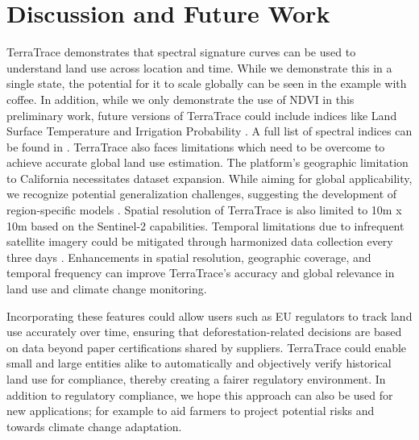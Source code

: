 \section{Discussion and Future Work}

TerraTrace demonstrates that spectral signature curves can be used to understand land use across location and time. While we demonstrate this in a single state, the potential for it to scale globally can be seen in the example with coffee. In addition, while we only demonstrate the use of NDVI in this preliminary work, future versions of TerraTrace could include indices like Land Surface Temperature \cite{LST} and Irrigation Probability \cite{ML}. A full list of spectral indices can be found in \cite{montero}.  TerraTrace also faces limitations which need to be overcome to achieve accurate global land use estimation. The platform's geographic limitation to California necessitates dataset expansion. While aiming for global applicability, we recognize potential generalization challenges, suggesting the development of region-specific models \cite{klemmer2024satclip}. Spatial resolution of TerraTrace is also limited to 10m x 10m based on the Sentinel-2 capabilities. Temporal limitations due to infrequent satellite imagery could be mitigated through harmonized data collection every three days \cite{HLS}. Enhancements in spatial resolution, geographic coverage, and temporal frequency can improve TerraTrace's accuracy and global relevance in land use and climate change monitoring.

Incorporating these features could allow users such as EU regulators to track land use accurately over time, ensuring that deforestation-related decisions are based on data beyond paper certifications shared by suppliers. TerraTrace could enable small and large entities alike to automatically and objectively verify historical land use for compliance, thereby creating a fairer regulatory environment. In addition to regulatory compliance, we hope this approach can also be used for new applications; for example to aid farmers to project potential risks and towards climate change adaptation.
